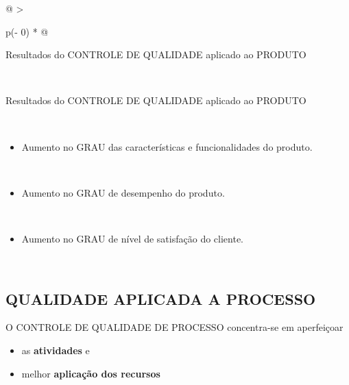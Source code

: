 \documentclass[
]{book}
\providecommand{\tightlist}{%
  \setlength{\itemsep}{0pt}\setlength{\parskip}{0pt}}
\begin{document}
\begin{longtable}[]{@{}
  >{\raggedright\arraybackslash}p{(\columnwidth - 0\tabcolsep) * }@{}}
\caption{Resultado esperado do CONTROLE DE QUALIDADE aplicado ao PRODUTO}\tabularnewline
\toprule\noalign{}
\begin{minipage}[b]{\linewidth}\raggedright
Resultados do CONTROLE DE QUALIDADE aplicado ao PRODUTO
\end{minipage} \\
\midrule\noalign{}
\endfirsthead
\toprule\noalign{}
\begin{minipage}[b]{\linewidth}\raggedright
Resultados do CONTROLE DE QUALIDADE aplicado ao PRODUTO
\end{minipage} \\
\midrule\noalign{}
\endhead
\bottomrule\noalign{}
\endlastfoot
\begin{minipage}[t]{\linewidth}\raggedright
\begin{itemize}
\tightlist
\item
  Aumento no GRAU das características e funcionalidades do produto.
\end{itemize}
\end{minipage} \\
\begin{minipage}[t]{\linewidth}\raggedright
\begin{itemize}
\tightlist
\item
  Aumento no GRAU de desempenho do produto.
\end{itemize}
\end{minipage} \\
\begin{minipage}[t]{\linewidth}\raggedright
\begin{itemize}
\tightlist
\item
  Aumento no GRAU de nível de satisfação do cliente.
\end{itemize}
\end{minipage} \\
\end{longtable}

\subsection{QUALIDADE APLICADA A PROCESSO}\label{qualidade-aplicada-a-processo}

O CONTROLE DE QUALIDADE DE PROCESSO concentra-se em aperfeiçoar

\begin{itemize}
\item
  as \textbf{atividades} e
\item
  melhor \textbf{aplicação dos recursos}
\end{itemize}
\end{document}
